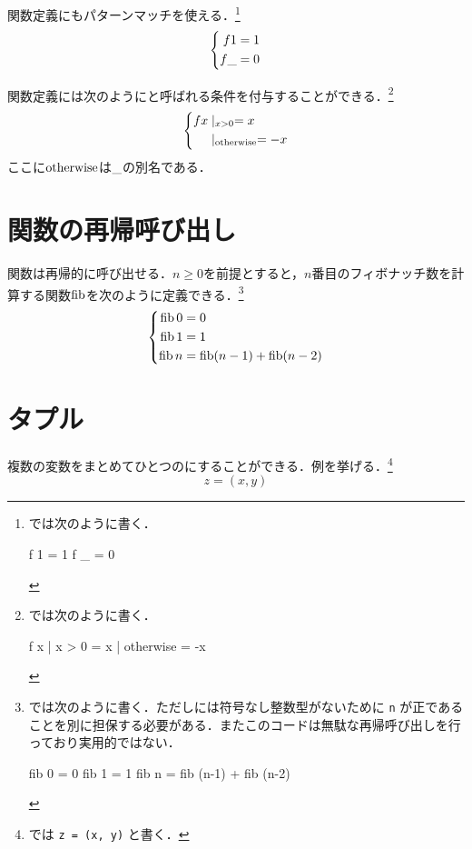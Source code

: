\documentclass[platex,a5paper,twoside,fleqn,draft]{jsbook}
\newcommand{\keyword}[1]{\textgt{\textbf{#1}}}
\begin{document}
関数定義にもパターンマッチを使える．\footnote{\haskell では次のように書く．
\begin{footcode}
      f 1 = 1
      f _ = 0
\end{footcode}}
\begin{equation}
\left\{\begin{aligned}f1&=1\\f\_&=0\end{aligned}\right.
\end{equation}

関数定義には次のように\keyword{ガード}と呼ばれる条件を付与することができる．\footnote{\haskell では次のように書く．
\begin{footcode}
      f x | x > 0     = x
          | otherwise = -x
\end{footcode}}
\begin{equation}
\left\{\begin{aligned}fx&\mid_{x>0}=x\\&\mid_{\mathrel{\textrm{otherwise}}}=-x\end{aligned}\right.
\end{equation}
ここに$\mathrel{\textrm{otherwise}}$は$\_$の別名である．

\section{関数の再帰呼び出し}

関数は再帰的に呼び出せる．$n\ge0$を前提とすると，$n$番目のフィボナッチ数を計算する関数$\mathop{\textrm{fib}}$を次のように定義できる．\footnote{\haskell では次のように書く．ただし\haskell には符号なし整数型がないために \verb|n| が正であることを別に担保する必要がある．またこのコードは無駄な再帰呼び出しを行っており実用的ではない．
\begin{footcode}
      fib 0 = 0
      fib 1 = 1
      fib n = fib (n-1) + fib (n-2)
\end{footcode}}
\begin{equation}
\left\{
\begin{aligned}
\mathop{\textrm{fib}} 0&=0\\
\mathop{\textrm{fib}} 1&=1\\
\mathop{\textrm{fib}} n&=\mathop{\textrm{fib}}(n-1)+\mathop{\textrm{fib}}(n-2)
\end{aligned}
\right.
\end{equation}

\section{タプル}

複数の変数をまとめてひとつの\keyword{タプル}にすることができる．例を挙げる．\footnote{\haskell では \verb|z = (x, y)| と書く．}
\begin{equation}
z=(x,y)
\end{equation}
\end{document}
